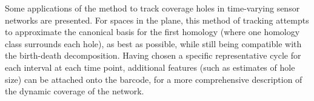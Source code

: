 \documentclass[12pt]{article}
\begin{document}
Some applications of the method to track coverage holes in time-varying sensor networks are presented. For spaces in the plane, this method of tracking attempts to approximate the canonical basis for the first homology (where one homology class surrounds each hole), as best as possible, while still being compatible with the birth-death decomposition. Having chosen a specific representative cycle for each interval at each time point, additional features (such as estimates of hole size) can be attached onto the barcode, for a more comprehensive description of the dynamic coverage of the network.





\end{document}
